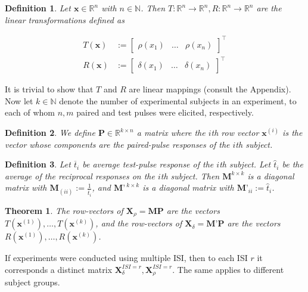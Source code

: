 \documentclass{article}
\newtheorem{definition}{Definition}
\newtheorem{theorem}{Theorem}
\begin{document}
\begin{multicols}{2}
\begin{definition}
    Let $\textbf{x} \in \mathbb{R}^n$ with $n \in \mathbb{N}$. Then $T:
    \mathbb{R}^n \to \mathbb{R}^n, R : \mathbb{R}^n \to \mathbb{R}^n$ are the
    linear transformations defined as

    \begin{align*}
        T(\textbf{x}) &:= \begin{bmatrix} 
        \rho(x_1) & \ldots & \rho(x_n)
        \end{bmatrix}^\intercal \\ R(\textbf{x}) &:= \begin{bmatrix} 
        \delta(x_1) & \ldots & \delta(x_n) 
    \end{bmatrix}^\intercal
    \end{align*}

\end{definition}

It is trivial to show that $T$ and $R$ are linear mappings (consult the
Appendix). Now let $k \in \mathbb{N}$ denote the number of experimental subjects
in an experiment, to each of whom $n, m$ paired and test pulses were elicited,
respectively.

\begin{definition}
    We define $\textbf{P} \in \mathbb{R}^{k \times n}$ a
    matrix where the $i$th row vector $\textbf{x}^{(i)}$ is the vector whose
    components are the paired-pulse responses of the $i$th subject.
\end{definition}

\begin{definition}
    Let $\overline{t}_i$ be average test-pulse response of the $i$th subject.
    Let $\hat{t}_i$ be the average of the \textit{reciprocal}
    responses on the $i$th subject. Then $\textbf{M}^{k \times k}$ is a diagonal
    matrix with $\textbf{M}_{(ii)} := \frac{1}{\overline{t}_i}$, and
    $\textbf{M'}^{~ k \times k}$ is a diagonal matrix with $\textbf{M'}_{ii} :=
    \hat{t}_i$.
\end{definition}

\begin{theorem}
    The row-vectors of $\textbf{X}_\rho = \textbf{M}\textbf{P}$ are the
    vectors $T(\textbf{x}^{(1)}), \ldots, T(\textbf{x}^{(k)})$, and
    the row-vectors of $\textbf{X}_\delta = \textbf{M'}\textbf{P}$ 
    are the vectors $R(\textbf{x}^{(1)}), \ldots,
    R(\textbf{x}^{(k)})$.
\end{theorem}


If experiments were conducted using multiple ISI, then to each ISI $r$ it
corresponds a distinct matrix $\textbf{X}_\delta^{ISI = r},
\textbf{X}_\rho^{ISI = r}$. The same applies to different subject groups.


\end{multicols}
\end{document}
